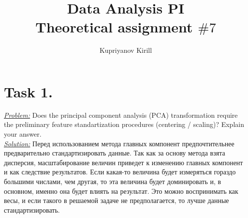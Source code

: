 \documentclass[a4paper,12pt]{article}
\author{Kupriyanov Kirill}
\title{Data Analysis PI\\Theoretical assignment $\#7$}
\date{}
\begin{document}
\maketitle
\thispagestyle{empty}
\newpage
\section*{Task 1.}
\underline{\textit{Problem:}} Does the principal component analysis (PCA) transformation require the preliminary feature standartization
procedures (centering / scaling)? Explain your answer.\\
\newline
\underline{\textit{Solution:}} Перед использованием метода главных компонент
предпочтительнее предварительно стандартизировать данные. Так как за основу
метода взята дисперсия, масштабирование величин приведет к изменению главных
компонент и как следствие результатов. Если какая-то величина будет измеряться
гораздо большими числами, чем другая, то эта величина будет доминировать и, в
основном, именно она будет влиять на результат. Это можно воспринимать как
весы, и если такого в решаемой задаче не предполагается, то лучше данные
стандартизировать.

\newpage
\end{document}
